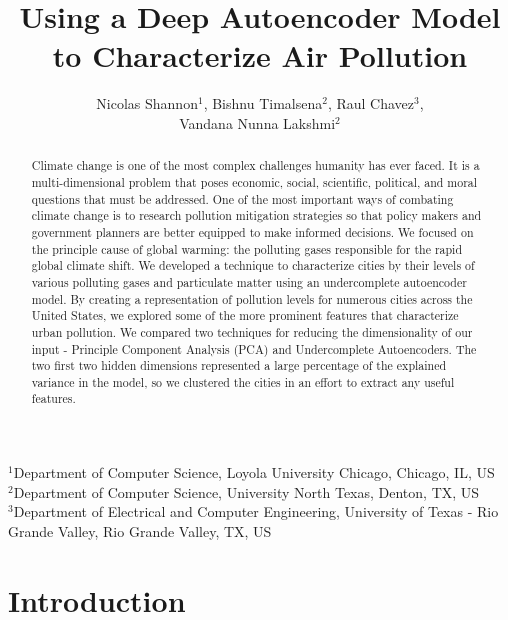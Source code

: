 \documentclass{article}
\title{Using a Deep Autoencoder Model to Characterize Air Pollution}
\author{Nicolas Shannon$^{1}$, Bishnu Timalsena$^{2}$, Raul Chavez$^{3}$, \\Vandana Nunna Lakshmi$^{2}$}
\date{}
\begin{document}
\begin{centering}

\maketitle

\vspace{-0.50cm}
\scriptsize
{$^{1}$Department of Computer Science, Loyola University Chicago, Chicago, IL, US}\\
{$^{2}$Department of Computer Science, University North Texas, Denton, TX, US}\\
{$^{3}$Department of Electrical and Computer Engineering, University of Texas - Rio Grande Valley, Rio Grande Valley, TX, US}

\end{centering}
\begin{abstract}
Climate change is one of the most complex challenges humanity has ever faced. It is a multi-dimensional
problem that poses economic, social, scientific, political, and moral 
questions that must be addressed. One of the most important ways of 
combating climate change is to research pollution mitigation strategies 
so that policy makers and government planners are better equipped to  make 
informed decisions. We focused on the principle cause of global warming:
the polluting gases responsible for the rapid global climate shift.
We developed a technique to characterize cities by their levels of 
various polluting gases and particulate matter using an undercomplete autoencoder 
model. By creating a representation of pollution levels for numerous cities
across the United States, we explored some of the more prominent features 
that characterize urban pollution. We compared two techniques for reducing 
the dimensionality of our input - Principle Component Analysis (PCA) and
Undercomplete Autoencoders. The two first two hidden dimensions represented
a
large percentage of the explained variance in the model, so we clustered the cities in an effort to extract any useful features.
\end{abstract}

\vspace{0.25cm}

\section{Introduction}
\blindtext\blindtext

\vspace{0.25cm}
\end{document}
